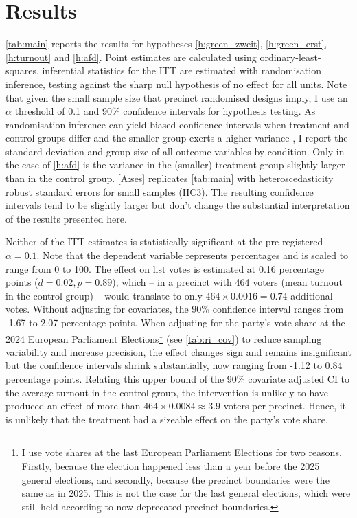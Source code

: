 \documentclass[11pt,a4paper]{scrartcl}
\begin{document}
\section{Results}

\autoref{tab:main} reports the results for hypotheses \ref{h:green_zweit}, \ref{h:green_erst}, \ref{h:turnout} and \ref{h:afd}. Point estimates are calculated using ordinary-least-squares, inferential statistics for the ITT are estimated with randomisation inference, testing against the sharp null hypothesis of no effect for all units. Note that given the small sample size that precinct randomised designs imply, I use an $\alpha$ threshold of 0.1 and 90\% confidence intervals for hypothesis testing. As randomisation inference can yield biased confidence intervals when treatment and control groups differ and the smaller group exerts a higher variance \autocite[68]{gerberFieldExperimentsDesign2012}, I report the standard deviation and group size of all outcome variables by condition. Only in the case of \autoref{h:afd} is the variance in the (smaller) treatment group slightly larger than in the control group. \autoref{A:ses} replicates \autoref{tab:main} with heteroscedasticity robust standard errors for small samples (HC3). The resulting confidence intervals tend to be slightly larger but don't change the substantial interpretation of the results presented here.




Neither of the ITT estimates is statistically significant at the pre-registered $\alpha = 0.1$. 	Note that the dependent variable represents percentages and is scaled to range from 0 to 100. The effect on list votes is estimated at 0.16 percentage points  ($d = 0.02, p = 0.89$), which -- in a precinct with 464 voters (mean turnout in the control group) -- would translate to only $464 \times 0.0016 = 0.74$ additional votes. Without adjusting for covariates, the 90\% confidence interval ranges from -1.67 to 2.07 percentage points. When adjusting for the party's vote share at the 2024 European Parliament Elections\footnote{I use vote shares at the last European Parliament Elections for two reasons. Firstly, because the election happened less than a year before the 2025 general elections, and secondly, because the precinct boundaries were the same as in 2025. This is not the case for the last general elections, which were still held according to now deprecated precinct boundaries.} (see \autoref{tab:ri_cov}) to reduce sampling variability and increase precision, the effect changes sign and remains insignificant but the confidence intervals shrink substantially, now ranging from -1.12 to 0.84 percentage points. Relating this upper bound of the 90\% covariate adjusted CI to the average turnout in the control group, the intervention is unlikely to have produced an effect of more than $464 \times 0.0084 \approx 3.9$ voters per precinct. Hence, it is unlikely that the treatment had a sizeable effect on the party's vote share.
\end{document}
